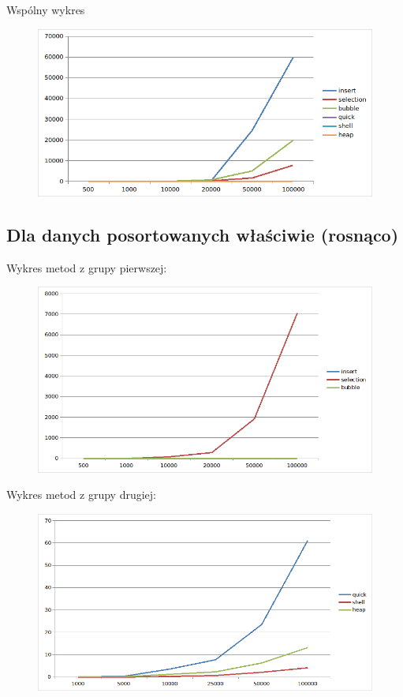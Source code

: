 \documentclass{article}
\begin{document}
Wspólny wykres
\begin{figure}[H]
    \centering
    \includegraphics[width=\textwidth]{"../assets/2_3.png"}
    \label{fig:2_3}
\end{figure}
\subsection*{Dla danych posortowanych właściwie (rosnąco)}
Wykres metod z grupy pierwszej:
\begin{figure}[H]
    \centering
    \includegraphics[width=\textwidth]{"../assets/3_1.png"}
    \label{fig:3_1}
\end{figure}


Wykres metod z grupy drugiej:
\begin{figure}[H]
    \centering
    \includegraphics[width=\textwidth]{"../assets/3_2.png"}
    \label{fig:3_2}
\end{figure}
\end{document}
